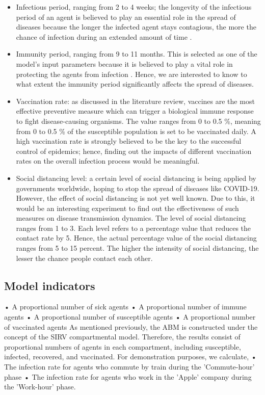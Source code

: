 \documentclass[smallextended]{svjour3}       %
\begin{document}
\begin{itemize}
	\item Infectious period, ranging from 2 to 4 weeks; the longevity of the infectious period of an agent is believed to play an essential role in the spread of diseases because the longer the infected agent stays contagious, the more the chance of infection during an extended amount of time \cite{wilkinson2018impact}.
	\item Immunity period, ranging from 9 to 11 months. This is selected as one of the model’s input parameters because it is believed to play a vital role in protecting the agents from infection \cite{reyes2016modeling}. Hence, we are interested to know to what extent the immunity period significantly affects the spread of diseases.
	\item Vaccination rate: as discussed in the literature review, vaccines are the most effective preventive measure which can trigger a biological immune response to fight disease-causing organisms. The value ranges from 0 to 0.5 \%, meaning from 0 to 0.5 \% of the susceptible population is set to be vaccinated daily. A high vaccination rate is strongly believed to be the key to the successful control of epidemics; hence, finding out the impacts of different vaccination rates on the overall infection process would be meaningful.
	\item Social distancing level: a certain level of social distancing is being applied by governments worldwide, hoping to stop the spread of diseases like COVID-19. However, the effect of social distancing is not yet well known. Due to this, it would be an interesting experiment to find out the effectiveness of such measures on disease transmission dynamics. The level of social distancing ranges from 1 to 3. Each level refers to a percentage value that reduces the contact rate by 5. Hence, the actual percentage value of the social distancing ranges from 5 to 15 percent. The higher the intensity of social distancing, the lesser the chance people contact each other.
\end{itemize}



\subsection{Model indicators}


• A proportional number of sick agents
• A proportional number of immune agents
• A proportional number of susceptible agents
• A proportional number of vaccinated agents
As mentioned previously, the ABM is constructed under the concept of the SIRV compartmental model. Therefore, the results consist of proportional numbers of agents in each compartment, including susceptible, infected, recovered, and vaccinated.
For demonstration purposes, we calculate,
• The infection rate for agents who commute by train during the 'Commute-hour' phase
• The infection rate for agents who work in the 'Apple' company during the 'Work-hour'
phase.
\end{document}

